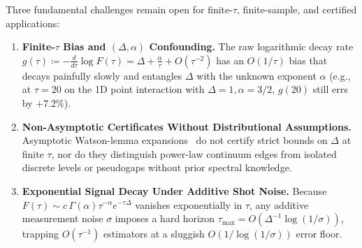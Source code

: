 \documentclass[11pt,a4paper]{article}
\theoremstyle{definition}
\begin{document}
Three fundamental challenges remain open for finite-$\tau$, finite-sample, and certified applications:
\begin{enumerate}[leftmargin=1.6em,itemsep=2pt]
  \item \textbf{Finite-$\tau$ Bias and $(\Delta, \alpha)$ Confounding.} The raw logarithmic decay rate $g(\tau) \coloneqq -\frac{d}{d\tau}\log F(\tau) = \Delta + \frac{\alpha}{\tau} + O(\tau^{-2})$ has an $O(1/\tau)$ bias that decays painfully slowly and entangles $\Delta$ with the unknown exponent $\alpha$ (e.g., at $\tau = 20$ on the 1D point interaction with $\Delta=1, \alpha=3/2$, $g(20)$ still errs by $+7.2\%$).
  \item \textbf{Non-Asymptotic Certificates Without Distributional Assumptions.} Asymptotic Watson-lemma expansions~\cite{Erdelyi1956Asymptotic} do not certify strict bounds on $\Delta$ at finite $\tau$, nor do they distinguish power-law continuum edges from isolated discrete levels or pseudogaps without prior spectral knowledge.
  \item \textbf{Exponential Signal Decay Under Additive Shot Noise.} Because $F(\tau) \sim c\,\Gamma(\alpha)\tau^{-\alpha} e^{-\tau\Delta}$ vanishes exponentially in $\tau$, any additive measurement noise $\sigma$ imposes a hard horizon $\tau_{\max} = O(\Delta^{-1}\log(1/\sigma))$, trapping $O(\tau^{-1})$ estimators at a sluggish $O(1/\log(1/\sigma))$ error floor.
\end{enumerate}
\end{document}
